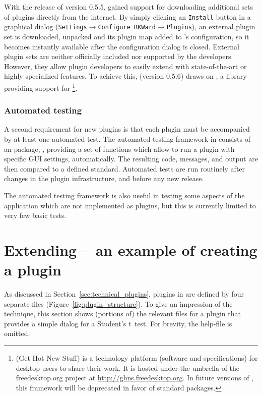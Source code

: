 \documentclass[article,shortnames]{jss}
\begin{document}
With the release of version 0.5.5,  gained support for downloading additional sets
of plugins directly from the internet. By simply clicking an \texttt{Install} button in a graphical dialog 
(\texttt{Settings$\rightarrow$Configure RKWard$\rightarrow$Plugins}), an
external plugin set is downloaded, unpacked and its plugin map added to 's configuration, so
it becomes instantly available after the configuration dialog is closed. External plugin sets are
neither officially included nor supported by the  developers. However, they allow plugin
developers to easily extend  with state-of-the-art or highly specialized features. To
achieve this,  (version 0.5.6) draws on , a  library providing support for \footnote{
 (Get Hot New Stuff) is a technology platform (software and specifications) for desktop users to share their work. It is hosted
under the umbrella of the freedesktop.org project at \url{http://ghns.freedesktop.org}.
In future versions of , this framework will be deprecated in favor of standard  packages.}.

\subsubsection{Automated testing}
\label{sec:technical_processes_automatedtesting}
A second requirement for new plugins is that each plugin must be accompanied by
at least one automated test. The automated testing framework in  consists
of an  package, , providing a set of  functions which allow to run a
plugin with specific GUI settings, automatically. The resulting  code,  messages, and
output are then compared to a defined standard. Automated tests are run routinely after changes in the
plugin infrastructure, and before any new release.

The automated testing framework is also useful in testing some aspects of the
application which are not implemented as plugins, but this is currently limited
to very few basic tests.

%
\section[Extending RKWard -- an example of creating a plugin]{Extending  -- an example of creating a plugin}
\label{sec:example_plugin}
As discussed in Section~\ref{sec:technical_plugins}, plugins in  are
defined by four separate files (Figure~\ref{fig:plugin_structure}). To give an impression of the technique,
this section shows (portions of) the relevant files for a plugin that provides
a simple dialog for a Student's $t$~test. For brevity, the help-file is omitted.
\end{document}
